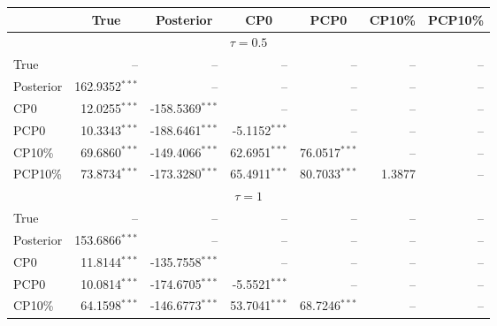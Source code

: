 { \renewcommand{\arraystretch}{1.2} 
 {\footnotesize 
\begin{table} 
\center 
\begin{tabular}{l | rrrrrr} 
& \multicolumn{1}{c}{True}& \multicolumn{1}{c}{Posterior}& \multicolumn{1}{c}{CP0}& \multicolumn{1}{c}{PCP0}& \multicolumn{1}{c}{CP10\%}& \multicolumn{1}{c}{PCP10\%} \\ \hline 
\multicolumn{7}{c}{$\tau = 0.5$} \\ \hline 
True &    --\phantom{$^{***}$} &    --\phantom{$^{***}$} &    --\phantom{$^{***}$} &    --\phantom{$^{***}$} &    --\phantom{$^{***}$} &    --\phantom{$^{***}$}   \\ 
Posterior & 162.9352$^{***}$ &    --\phantom{$^{***}$} &    --\phantom{$^{***}$} &    --\phantom{$^{***}$} &    --\phantom{$^{***}$} &    --\phantom{$^{***}$}   \\ 
CP0 & 12.0255$^{***}$ & -158.5369$^{***}$ &    --\phantom{$^{***}$} &    --\phantom{$^{***}$} &    --\phantom{$^{***}$} &    --\phantom{$^{***}$}   \\ 
PCP0 & 10.3343$^{***}$ & -188.6461$^{***}$ & -5.1152$^{***}$ &    --\phantom{$^{***}$} &    --\phantom{$^{***}$} &    --\phantom{$^{***}$}   \\ 
CP10\% & 69.6860$^{***}$ & -149.4066$^{***}$ & 62.6951$^{***}$ & 76.0517$^{***}$ &    --\phantom{$^{***}$} &    --\phantom{$^{***}$}   \\ 
PCP10\% & 73.8734$^{***}$ & -173.3280$^{***}$ & 65.4911$^{***}$ & 80.7033$^{***}$ & 1.3877\phantom{$^{***}$} &    --\phantom{$^{***}$}   \\ 
\hline 
\multicolumn{7}{c}{$\tau = 1$} \\ \hline 
True &    --\phantom{$^{***}$} &    --\phantom{$^{***}$} &    --\phantom{$^{***}$} &    --\phantom{$^{***}$} &    --\phantom{$^{***}$} &    --\phantom{$^{***}$}   \\ 
Posterior & 153.6866$^{***}$ &    --\phantom{$^{***}$} &    --\phantom{$^{***}$} &    --\phantom{$^{***}$} &    --\phantom{$^{***}$} &    --\phantom{$^{***}$}   \\ 
CP0 & 11.8144$^{***}$ & -135.7558$^{***}$ &    --\phantom{$^{***}$} &    --\phantom{$^{***}$} &    --\phantom{$^{***}$} &    --\phantom{$^{***}$}   \\ 
PCP0 & 10.0814$^{***}$ & -174.6705$^{***}$ & -5.5521$^{***}$ &    --\phantom{$^{***}$} &    --\phantom{$^{***}$} &    --\phantom{$^{***}$}   \\ 
CP10\% & 64.1598$^{***}$ & -146.6773$^{***}$ & 53.7041$^{***}$ & 68.7246$^{***}$ &    --\phantom{$^{***}$} &    --\phantom{$^{***}$}   \\ 

\end{tabular}
\end{table}}}
